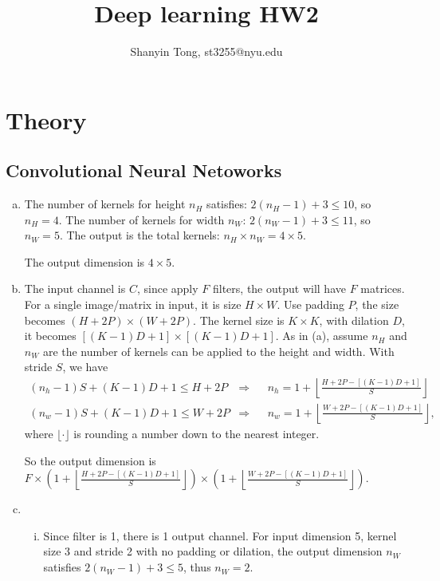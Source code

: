 \documentclass[10pt,a4paper]{article}
\theoremstyle{dotlessP}
\begin{document}
\title{Deep learning HW2}
\author{Shanyin Tong, st3255@nyu.edu}

\maketitle


\section{Theory}

\subsection{Convolutional Neural Netoworks}
\begin{enumerate}[(a)]
	\item The number of kernels for height $n_H$ satisfies: $2(n_H-1)+3\leq 10$, so $n_H=4$. The number of kernels for width $n_W$: $2(n_W-1)+3\leq 11$, so $n_W=5$. The output is the total kernels: $n_H\times n_W=4\times5$.
	
	The output dimension is $4\times5$.
	\item The input channel is $C$, since apply $F$ filters, the output will have $F$ matrices. For a single image/matrix in input, it is size $H\times W$. Use padding $P$, the size becomes $(H+2P)\times(W+2P)$. The kernel size is $K\times K$, with dilation $D$, it becomes $[(K-1)D+1]\times[(K-1)D+1]$. As in (a), assume $n_H$ and $n_W$ are the number of kernels can be applied to the height and width. With stride $S$, we have
	\begin{equation*}
	\begin{aligned}
	(n_h-1)S+(K-1)D+1\leq H+2P &\Rightarrow && n_h = 1+\left\lfloor\frac{H+2P-[(K-1)D+1]}{S}\right\rfloor\\
	(n_w-1)S+(K-1)D+1\leq W+2P&\Rightarrow&& n_w = 1+\left\lfloor\frac{W+2P-[(K-1)D+1]}{S}\right\rfloor,
	\end{aligned}
	\end{equation*}
	where $\lfloor\cdot\rfloor$ is rounding a number down to the nearest integer.
	
	So the output dimension is $F\times\left( 1+\left\lfloor\frac{H+2P-[(K-1)D+1]}{S}\right\rfloor\right) \times \left(1+\left\lfloor\frac{W+2P-[(K-1)D+1]}{S}\right\rfloor \right) $.
	
	\item \begin{enumerate}[(i)] 
		\item Since filter is 1, there is 1 output channel. For input dimension 5, kernel size 3 and stride 2 with no padding or dilation, the output dimension $n_W$ satisfies $2(n_W-1)+3\leq 5$, thus $n_W=2$. 
		

\end{enumerate}
\end{enumerate}
\end{document}
